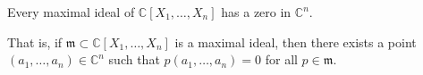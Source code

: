 Every maximal ideal of $\mathbb{C}[X_1, \ldots, X_n]$ has a zero in $\mathbb{C}^n$.

That is, if $\mathfrak{m} \subset \mathbb{C}[X_1, \ldots, X_n]$ is a maximal ideal, then there exists a point $(a_1, \ldots, a_n) \in \mathbb{C}^n$ such that $p(a_1, \ldots, a_n) = 0$ for all $p \in \mathfrak{m}$.
